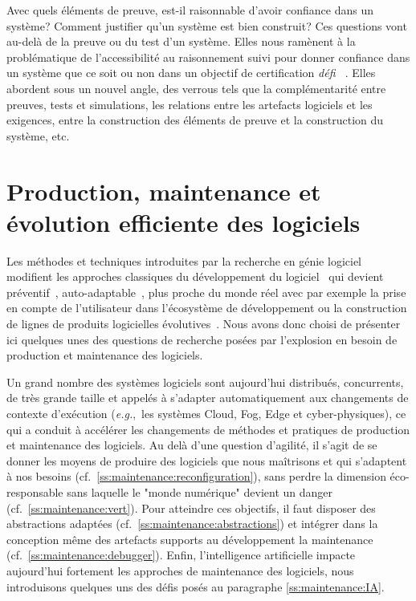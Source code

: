 \documentclass[11pt]{article}
\newcommand{\eg}[0]{\emph{e.g.},~}
\newcommand{\cf}[0]{cf.~}
\newcommand{\defi}[1]{\emph{défi~%
\cite{#1}}}
\begin{document}
Avec quels éléments de preuve, est-il raisonnable d'avoir confiance dans un système? Comment justifier qu'un système est bien construit? Ces questions vont au-delà de la preuve ou du test d'un système. Elles nous ramènent à  la problématique de l'accessibilité au raisonnement suivi pour donner confiance dans un système que ce soit ou non dans un objectif de certification \defi{argumentation}.  Elles abordent sous un nouvel angle, des verrous tels que la 
complémentarité entre preuves, tests et simulations, les relations entre les artefacts logiciels et les exigences, entre la construction des éléments de preuve et la construction du système, etc. 

\section{Production, maintenance et évolution efficiente des logiciels \label{s:maintenance}}
Les méthodes et techniques introduites par la recherche en génie logiciel modifient les approches classiques du développement du logiciel~\cite{Broy18} qui devient préventif~\cite{Hamilton18}, auto-adaptable~\cite{Chandra2020, murphy19}, plus proche du monde réel avec par exemple la prise en compte de l’utilisateur dans l’écosystème de développement ou la construction de lignes de produits logicielles évolutives~\cite{Marques2019}. Nous avons donc choisi de présenter ici quelques unes des questions de recherche posées par l'explosion en besoin de production et maintenance des logiciels.


Un grand nombre des systèmes logiciels sont aujourd'hui distribués, concurrents, de très grande taille et appelés à s'adapter automatiquement aux changements de contexte d'exécution (\eg les systèmes Cloud, Fog, Edge et cyber-physiques), ce qui a conduit à accélérer les changements de méthodes et pratiques de production et maintenance des logiciels.   Au delà d'une question d'agilité, il s'agit de se donner les moyens de produire des logiciels que nous maîtrisons 
et qui s'adaptent à nos besoins (\cf\ref{ss:maintenance:reconfiguration}), sans perdre la dimension éco-responsable sans laquelle le "monde numérique" devient un danger (\cf\ref{ss:maintenance:vert}). Pour atteindre ces objectifs, il faut disposer des abstractions adaptées (\cf\ref{ss:maintenance:abstractions}) et intégrer dans la conception même des artefacts supports au développement la maintenance (\cf\ref{ss:maintenance:debugger}). Enfin, l'intelligence artificielle impacte aujourd'hui fortement les approches de maintenance des logiciels, nous introduisons quelques uns des défis posés au paragraphe \ref{ss:maintenance:IA}.
\end{document}
